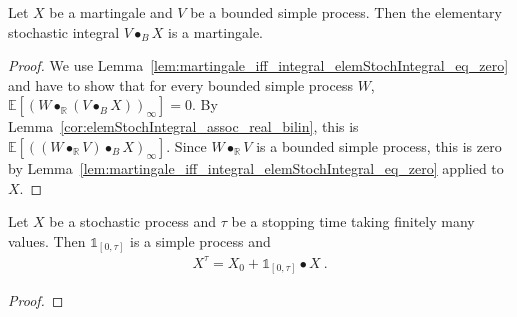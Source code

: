 \begin{lemma}\label{lem:Martingale.elemStochIntegral}
Let $X$ be a martingale and $V$ be a bounded simple process.
Then the elementary stochastic integral $V \bullet_B X$ is a martingale.
\end{lemma}

\begin{proof}
We use Lemma~\ref{lem:martingale_iff_integral_elemStochIntegral_eq_zero} and have to show that for every bounded simple process $W$, $\mathbb{E}[(W \bullet_{\mathbb{R}} (V \bullet_B X))_\infty] = 0$.
By Lemma~\ref{cor:elemStochIntegral_assoc_real_bilin}, this is $\mathbb{E}[((W \bullet_{\mathbb{R}} V) \bullet_B X)_\infty]$.
Since $W \bullet_{\mathbb{R}} V$ is a bounded simple process, this is zero by Lemma~\ref{lem:martingale_iff_integral_elemStochIntegral_eq_zero} applied to $X$.
\end{proof}


\begin{lemma}\label{lem:stoppedProcess_eq_elemStochIntegral}
  \notready
Let $X$ be a stochastic process and $τ$ be a stopping time taking finitely many values.
Then $\mathbb{1}_{[0, τ]}$ is a simple process and
\begin{align*}
  X^τ = X_0 + \mathbb{1}_{[0, τ]} \bullet X
  \: .
\end{align*}
\end{lemma}

\begin{proof}

\end{proof}
